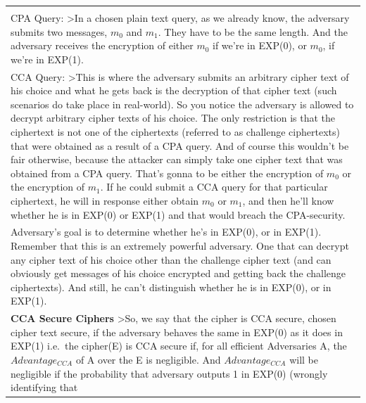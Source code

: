 \documentclass[11pt]{article}
\begin{document}
\begin{longtable}[]{@{}l@{}}
\begin{minipage}[t]{0.07\columnwidth}
\end{minipage}\tabularnewline
\begin{minipage}[t]{0.07\columnwidth}\raggedright
CPA Query: \textgreater{}In a chosen plain text query, as we already
know, the adversary submits two messages, \(m_{0}\) and \(m_{1}\). They
have to be the same length. And the adversary receives the encryption of
either \(m_{0}\) if we're in EXP(0), or \(m_{0}\), if we're in
EXP(1).\strut
\end{minipage}\tabularnewline
\begin{minipage}[t]{0.07\columnwidth}\raggedright
CCA Query: \textgreater{}This is where the adversary submits an
arbitrary cipher text of his choice and what he gets back is the
decryption of that cipher text (such scenarios do take place in
real-world). So you notice the adversary is allowed to decrypt arbitrary
cipher texts of his choice. The only restriction is that the ciphertext
is not one of the ciphertexts (referred to as challenge ciphertexts)
that were obtained as a result of a CPA query. And of course this
wouldn't be fair otherwise, because the attacker can simply take one
cipher text that was obtained from a CPA query. That's gonna to be
either the encryption of \(m_{0}\) or the encryption of \(m_{1}\). If he
could submit a CCA query for that particular ciphertext, he will in
response either obtain \(m_{0}\) or \(m_{1}\), and then he'll know
whether he is in EXP(0) or EXP(1) and that would breach the
CPA-security.\strut
\end{minipage}\tabularnewline
\begin{minipage}[t]{0.07\columnwidth}\raggedright
Adversary's goal is to determine whether he's in EXP(0), or in EXP(1).
Remember that this is an extremely powerful adversary. One that can
decrypt any cipher text of his choice other than the challenge cipher
text (and can obviously get messages of his choice encrypted and getting
back the challenge ciphertexts). And still, he can't distinguish whether
he is in EXP(0), or in EXP(1).\strut
\end{minipage}\tabularnewline
\begin{minipage}[t]{0.07\columnwidth}\raggedright
\textbf{CCA Secure Ciphers} \textgreater{}So, we say that the cipher is
CCA secure, chosen cipher text secure, if the adversary behaves the same
in EXP(0) as it does in EXP(1) i.e.~the cipher(E) is CCA secure if, for
all efficient Adversaries A, the \(Advantage_{CCA}\) of A over the E is
negligible. And \(Advantage_{CCA}\) will be negligible if the
probability that adversary outputs 1 in EXP(0) (wrongly identifying that

\end{minipage}
\end{longtable}
\end{document}
